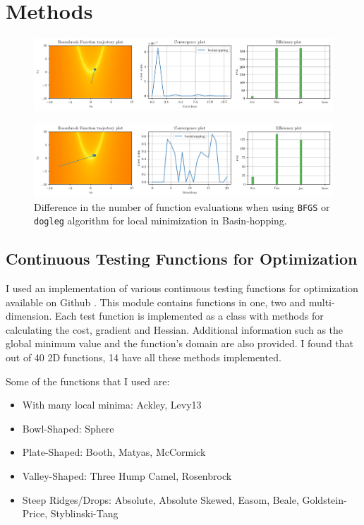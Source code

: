 \documentclass[conference]{IEEEtran}
\begin{document}
\section{Methods}

\begin{figure}[htbp]
\centerline{\includegraphics[width=\textwidth]{bfgs.png}}
\end{figure}

\begin{figure}[htbp]
\centerline{\includegraphics[width=\textwidth]{dogleg.png}}
\caption{Difference in the number of function evaluations when using \texttt{BFGS} or \texttt{dogleg} algorithm for local minimization in Basin-hopping. }
\label{dogleg}
\end{figure}

\subsection{Continuous Testing Functions for Optimization}

I used an implementation of various continuous testing functions for optimization available on Github \cite{b3}. This module contains functions in one, two and multi-dimension. Each test function is implemented as a class with methods for calculating the cost, gradient and Hessian. Additional information such as the global minimum value and the function's domain are also provided. I found that out of 40 2D functions, 14 have all these methods implemented.

Some of the functions that I used are:

\begin{itemize}
    \item With many local minima: Ackley, Levy13
    \item Bowl-Shaped: Sphere
    \item Plate-Shaped: Booth, Matyas, McCormick
    \item Valley-Shaped: Three Hump Camel, Rosenbrock
    \item Steep Ridges/Drops: Absolute, Absolute Skewed, Easom, Beale, Goldstein-Price, Styblinski-Tang
\end{itemize}
\end{document}
